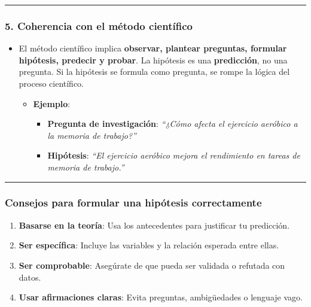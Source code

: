 \documentclass[
  10pt]{article}
\providecommand{\tightlist}{%
  \setlength{\itemsep}{0pt}\setlength{\parskip}{0pt}}\usepackage{longtable,booktabs,array}
\begin{document}
\begin{tcolorbox}
\begin{center}\rule{0.5\linewidth}{0.5pt}\end{center}

\subsubsection{\texorpdfstring{\textbf{5. Coherencia con el método
científico}}{5. Coherencia con el método científico}}\label{coherencia-con-el-muxe9todo-cientuxedfico}

\begin{itemize}
\tightlist
\item
  El método científico implica \textbf{observar, plantear preguntas,
  formular hipótesis, predecir y probar}. La hipótesis es una
  \textbf{predicción}, no una pregunta. Si la hipótesis se formula como
  pregunta, se rompe la lógica del proceso científico.

  \begin{itemize}
  \tightlist
  \item
    \textbf{Ejemplo}:

    \begin{itemize}
    \tightlist
    \item
      \textbf{Pregunta de investigación}: \emph{``¿Cómo afecta el
      ejercicio aeróbico a la memoria de trabajo?''}\\
    \item
      \textbf{Hipótesis}: \emph{``El ejercicio aeróbico mejora el
      rendimiento en tareas de memoria de trabajo.''}
    \end{itemize}
  \end{itemize}
\end{itemize}

\begin{center}\rule{0.5\linewidth}{0.5pt}\end{center}

\subsubsection{\texorpdfstring{\textbf{Consejos para formular una
hipótesis
correctamente}}{Consejos para formular una hipótesis correctamente}}\label{consejos-para-formular-una-hipuxf3tesis-correctamente}

\begin{enumerate}
\def\labelenumi{\arabic{enumi}.}
\tightlist
\item
  \textbf{Basarse en la teoría}: Usa los antecedentes para justificar tu
  predicción.\\
\item
  \textbf{Ser específica}: Incluye las variables y la relación esperada
  entre ellas.\\
\item
  \textbf{Ser comprobable}: Asegúrate de que pueda ser validada o
  refutada con datos.\\
\item
  \textbf{Usar afirmaciones claras}: Evita preguntas, ambigüedades o
  lenguaje vago.
\end{enumerate}


\end{tcolorbox}
\end{document}

